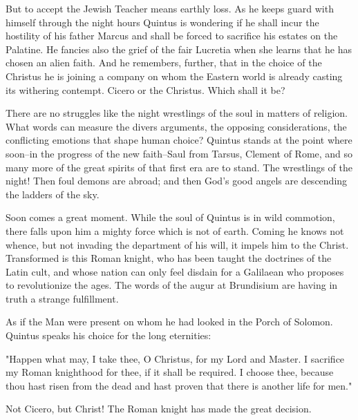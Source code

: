 But to accept the Jewish Teacher means earthly loss.  As he keeps
guard with himself through the night hours Quintus is wondering if
he shall incur the hostility of his father Marcus and shall be
forced to sacrifice his estates on the Palatine.  He fancies also
the grief of the fair Lucretia when she learns that he has chosen
an alien faith.  And he remembers, further, that in the choice of
the Christus he is joining a company on whom the Eastern world is
already casting its withering contempt.  Cicero or the Christus.
Which shall it be?


There are no struggles like the night wrestlings of the soul in
matters of religion.  What words can measure the divers arguments,
the opposing considerations, the conflicting emotions that shape
human choice?  Quintus stands at the point where soon--in the
progress of the new faith--Saul from Tarsus, Clement of Rome, and
so many more of the great spirits of that first era are to stand.
The wrestlings of the night!  Then foul demons are abroad; and then
God's good angels are descending the ladders of the sky.

Soon comes a great moment.  While the soul of Quintus is in wild
commotion, there falls upon him a mighty force which is not of
earth.  Coming he knows not whence, but not invading the department
of his will, it impels him to the Christ.  Transformed is this
Roman knight, who has been taught the doctrines of the Latin cult,
and whose nation can only feel disdain for a Galilaean who proposes
to revolutionize the ages.  The words of the augur at Brundisium
are having in truth a strange fulfillment.

As if the Man were present on whom he had looked in the Porch of
Solomon.  Quintus speaks his choice for the long eternities:

"Happen what may, I take thee, O Christus, for my Lord and Master.
I sacrifice my Roman knighthood for thee, if it shall be required.
I choose thee, because thou hast risen from the dead and hast
proven that there is another life for men."

Not Cicero, but Christ!  The Roman knight has made the great
decision.